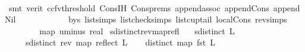 \begin{isabellebody}
\ \ \ \ \ \ \ \ \ \ \ \ \ {}\ \isanewline
\ \ \ \ \ \ \ \ \isamarkupfalse%
\ {\isacharparenleft}{\kern0pt}smt\ {\isacharparenleft}{\kern0pt}verit{\isacharcomma}{\kern0pt}\ ccfv{\isacharunderscore}{\kern0pt}threshold{\isacharparenright}{\kern0pt}\ Cons{\isachardot}{\kern0pt}IH\ Cons{\isachardot}{\kern0pt}prems{\isacharparenleft}{\kern0pt}{}{\isacharparenright}{\kern0pt}\ append{\isachardot}{\kern0pt}assoc\ append{\isacharunderscore}{\kern0pt}Cons\ append{\isacharunderscore}{\kern0pt}Nil\isanewline
\ \ \ \ \ \ \ \ \ \ \ \ b{\isacharunderscore}{\kern0pt}ys\ list{\isachardot}{\kern0pt}simps{\isacharparenleft}{\kern0pt}{}{\isacharparenright}{\kern0pt}\ list{\isacharunderscore}{\kern0pt}check{\isachardot}{\kern0pt}simps{\isacharparenleft}{\kern0pt}{}{\isacharparenright}{\kern0pt}\ list{\isacharunderscore}{\kern0pt}cup{\isacharunderscore}{\kern0pt}tail\ local{\isachardot}{\kern0pt}Cons\ rev{\isachardot}{\kern0pt}simps{\isacharparenleft}{\kern0pt}{}{\isacharparenright}{\kern0pt}{\isacharparenright}{\kern0pt}\isanewline
\ \ \ \ \isamarkupfalse%
\isanewline
\ \ \isamarkupfalse%
\isanewline
{}\isamarkupfalse%
%
\endisatagproof
{\isafoldproof}%
%
\isadelimproof
%
\endisadelimproof
\isanewline
\isanewline
{}\isamarkupfalse%
\ {\isachardoublequoteopen}map\ uminus\ {\isacharbrackleft}{\kern0pt}{}{\isacharcomma}{\kern0pt}{}{\isacharcomma}{\kern0pt}{}{\isacharcolon}{\kern0pt}{\isacharcolon}{\kern0pt}real{\isacharbrackright}{\kern0pt}{\isachardoublequoteclose}\isanewline
\isanewline
{}\isamarkupfalse%
\ sdistinct{\isacharunderscore}{\kern0pt}rev{\isacharunderscore}{\kern0pt}map{\isacharunderscore}{\kern0pt}refl{}{\isacharcolon}{\kern0pt}\isanewline
\ \ \ {\isachardoublequoteopen}sdistinct\ L{\isachardoublequoteclose}\isanewline
\ \ \ \ \ {\isachardoublequoteopen}sdistinct\ {\isacharparenleft}{\kern0pt}rev\ {\isacharparenleft}{\kern0pt}map\ reflect\ L{\isacharparenright}{\kern0pt}{\isacharparenright}{\kern0pt}{\isachardoublequoteclose}\isanewline
%
\isadelimproof
%
\endisadelimproof
%
\isatagproof
{}\isamarkupfalse%
{\isacharminus}{\kern0pt}\isanewline
\ \ \isamarkupfalse%
\ {}{\isacharcolon}{\kern0pt}{\isachardoublequoteopen}distinct\ {\isacharparenleft}{\kern0pt}map\ fst\ L{\isacharparenright}{\kern0pt}{\isachardoublequoteclose}\ \isamarkupfalse%

\end{isabellebody}
